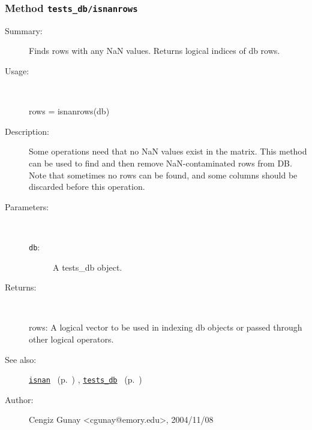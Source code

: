 \subsubsection[Method \texttt{isnanrows}]{Method \texttt{tests\_db/isnanrows}}%
%
\label{ref_tests_db__isnanrows}%
\hypertarget{ref_tests_db__isnanrows}{}%
\begin{description}
\item[Summary:]Finds rows with any NaN values. Returns logical indices of db rows.
%
\item[Usage:]~%
\begin{lyxcode}%
rows = isnanrows(db)
%
\end{lyxcode}%
%
\item[Description:]%
Some operations need that no NaN values exist in the matrix. This method
 can be used to find and then remove NaN-contaminated rows from DB. Note
 that sometimes no rows can  be found, and some columns should be discarded
 before this operation.
\item[Parameters:]~
\begin{description}%
\item[\texttt{db}:]
 A tests\_db object.
\end{description}%
%
\item[Returns:
]~

	rows: A logical vector to be used in indexing db objects or passed
		through other logical operators. 
%
%
\item[See also:]%
\hyperlink{ref_isnan}{\texttt{isnan}}%
\ (p.~\pageref{ref_isnan})%
%
, \hyperlink{ref_tests_db}{\texttt{tests\_db}}%
\ (p.~\pageref{ref_tests_db})%
%
%
\item[Author:]%
Cengiz Gunay <cgunay@emory.edu>, 2004/11/08
%
\end{description}
\methodline%
